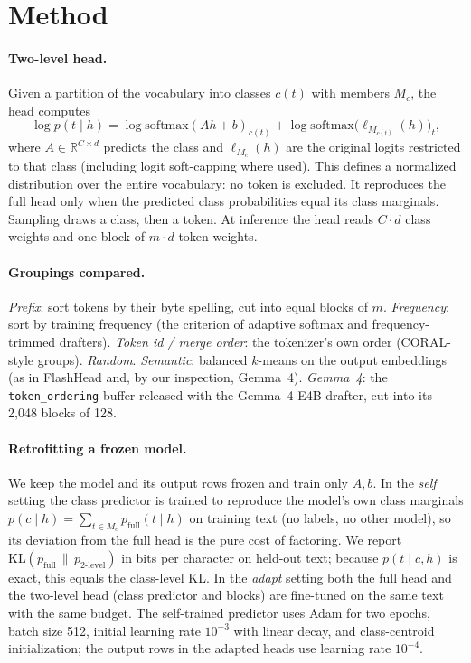\documentclass[11pt]{article}
\begin{document}
\section{Method}

\paragraph{Two-level head.} Given a partition of the vocabulary into classes $c(t)$ with members $M_c$, the head computes
\[
\log p(t\mid h) = \log \mathrm{softmax}(A h + b)_{c(t)} + \log \mathrm{softmax}\big(\ell_{M_{c(t)}}(h)\big)_{t},
\]
where $A\in\mathbb{R}^{C\times d}$ predicts the class and $\ell_{M_c}(h)$ are the original logits restricted to that class (including logit soft-capping where used). This defines a normalized distribution over the entire vocabulary: no token is excluded. It reproduces the full head only when the predicted class probabilities equal its class marginals. Sampling draws a class, then a token. At inference the head reads $C\cdot d$ class weights and one block of $m\cdot d$ token weights.

\paragraph{Groupings compared.} \emph{Prefix}: sort tokens by their byte spelling, cut into equal blocks of $m$. \emph{Frequency}: sort by training frequency (the criterion of adaptive softmax and frequency-trimmed drafters). \emph{Token id / merge order}: the tokenizer's own order (CORAL-style groups). \emph{Random}. \emph{Semantic}: balanced $k$-means on the output embeddings (as in FlashHead and, by our inspection, Gemma~4). \emph{Gemma~4}: the \texttt{token\_ordering} buffer released with the Gemma~4 E4B drafter, cut into its 2{,}048 blocks of 128.

\paragraph{Retrofitting a frozen model.} We keep the model and its output rows frozen and train only $A,b$. In the \emph{self} setting the class predictor is trained to reproduce the model's own class marginals $p(c\mid h)=\sum_{t\in M_c}p_{\text{full}}(t\mid h)$ on training text (no labels, no other model), so its deviation from the full head is the pure cost of factoring. We report $\mathrm{KL}(p_{\text{full}}\,\|\,p_{\text{2-level}})$ in bits per character on held-out text; because $p(t\mid c,h)$ is exact, this equals the class-level KL. In the \emph{adapt} setting both the full head and the two-level head (class predictor and blocks) are fine-tuned on the same text with the same budget. The self-trained predictor uses Adam for two epochs, batch size 512, initial learning rate $10^{-3}$ with linear decay, and class-centroid initialization; the output rows in the adapted heads use learning rate $10^{-4}$.
\end{document}
